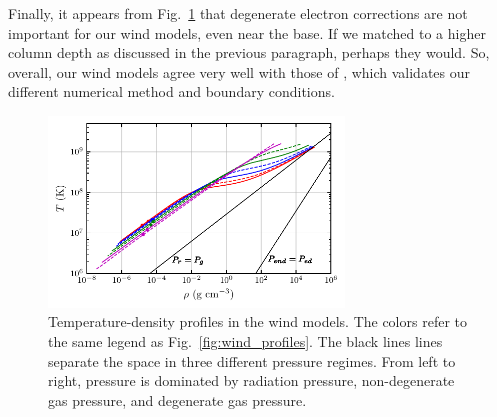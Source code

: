 \documentclass[../main.tex]{subfiles}
\begin{document}
Finally, it appears from Fig.~\ref{fig:wind_rho_T} that degenerate electron corrections are not important for our wind models, even near the base. If we matched to a higher column depth as discussed in the previous paragraph, perhaps they would. So, overall, our wind models agree very well with those of \citet{Paczynski1986b}, which validates our different numerical method and boundary conditions.


\begin{figure}
    \centering
    \includegraphics[width=0.7\textwidth]{figures/wind_rho_T.pdf}
    \caption{Temperature-density profiles in the wind models. The colors refer to the same legend as Fig.~\ref{fig:wind_profiles}. The black lines lines separate the space in three different pressure regimes. From left to right, pressure is dominated by radiation pressure, non-degenerate gas pressure, and degenerate gas pressure.}
    \label{fig:wind_rho_T}
\end{figure}

\newpage
\biblio
\end{document}

